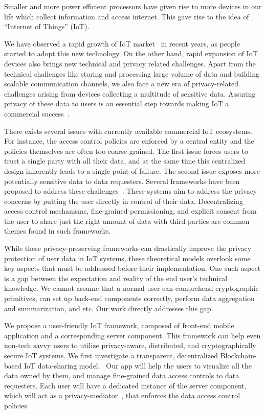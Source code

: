 Smaller and more power efficient processors have given rise to more devices in our life which collect information and access internet. This gave rise to the idea of ``Internet of Things'' (IoT).

We have observed a rapid growth of IoT market~\cite{idc} in recent years, as people started to adopt this new technology. On the other hand, rapid expansion of IoT devices also brings new technical and privacy related challenges. Apart from the technical challenges like storing and processing large volume of data and building scalable communication channels, we also face a new era of privacy-related challenges arising from devices collecting a multitude of sensitive data. Assuring privacy of these data to users is an essential step towards making IoT a commercial success~\cite{davies}.

There exists several issues with currently available commercial IoT ecosystems. For instance, the access control policies are enforced by a central entity and the policies themselves are often too coarse-grained. The first issue forces users to trust a single party with all their data, and at the same time this centralized design inherently leads to a single point of failure. The second issue exposes more potentially sensitive data  to data requesters. Several frameworks have been proposed to address these challenges~\cite{campbell,davies}. These systems aim to address the privacy concerns by putting the user directly in control of their data. Decentralizing access control mechanisms, fine-grained permissioning, and explicit consent from the user to share just the right amount of data with third parties are common themes found in such frameworks.

While these privacy-preserving frameworks can drastically improve the privacy protection of user data in IoT systems, these theoretical models overlook some key aspects that must be addressed before their implementation. One such aspect is a gap between the expectation and reality of the end user's technical knowledge. We cannot assume that a normal user can comprehend cryptographic primitives, can set up back-end components correctly, perform data aggregation and summarization, and etc. Our work directly addresses this gap.

We propose a user-friendly IoT framework, composed of front-end mobile application and a corresponding server component. This framework can help even non-tech savvy users to  utilize privacy-aware, distributed, and cryptographically secure IoT systems. We first investigate a transparent, decentralized Blockchain-based IoT data-sharing model.~\cite{campbell} Our app will help the users to visualize all the data owned by them, and manage fine-grained data access controls to data requesters. Each user will have a dedicated instance of the server component, which will act as a privacy-mediator~\cite{davies}, that enforces the data access control policies.

